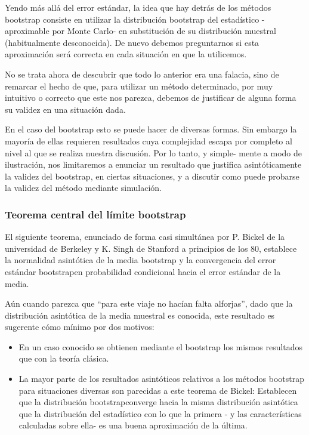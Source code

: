 \documentclass[
]{article}
\providecommand{\tightlist}{%
  \setlength{\itemsep}{0pt}\setlength{\parskip}{0pt}}
\begin{document}
Yendo más allá del error estándar, la idea que hay detrás de los métodos bootstrap consiste en utilizar la distribución bootstrap del estadístico -aproximable por Monte Carlo- en substitución de su distribución muestral (habitualmente desconocida). De nuevo debemos preguntarnos si esta aproximación será correcta en cada situación en que la utilicemos.

No se trata ahora de descubrir que todo lo anterior era una falacia, sino de remarcar el hecho de que, para utilizar un método determinado, por muy intuitivo o correcto que este nos parezca, debemos de justificar de alguna forma su validez en una situación dada.

En el caso del bootstrap esto se puede hacer de diversas formas. Sin embargo la mayoría de ellas requieren resultados cuya complejidad escapa por completo al nivel al que se realiza nuestra discusión. Por lo tanto, y simple-
mente a modo de ilustración, nos limitaremos a enunciar un resultado que justifica asintóticamente la validez del bootstrap, en ciertas situaciones, y a discutir como puede probarse la validez del método mediante simulación.

\subsubsection{Teorema central del límite bootstrap}\label{teorema-central-del-luxedmite-bootstrap}

El siguiente teorema, enunciado de forma casi simultánea por P. Bickel de la universidad de Berkeley y K. Singh de Stanford a principios de los 80, establece la normalidad asintótica de la media bootstrap y la convergencia del error estándar bootstrapen probabilidad condicional hacia el error estándar de la media.

Aún cuando parezca que ``para este viaje no hacían falta alforjas'', dado que la distribución asintótica de la media muestral es conocida, este resultado es sugerente cómo mínimo por dos motivos:

\begin{itemize}
\tightlist
\item
  En un caso conocido se obtienen mediante el bootstrap los mismos resultados que con la teoría clásica.
\item
  La mayor parte de los resultados asintóticos relativos a los métodos bootstrap para situaciones diversas son parecidas a este teorema de Bickel: Establecen que la distribución bootstrapconverge hacia la misma distribución asintótica que la distribución del estadístico con lo que la primera - y las características calculadas sobre ella- es una buena aproximación de la última.
\end{itemize}
\end{document}
